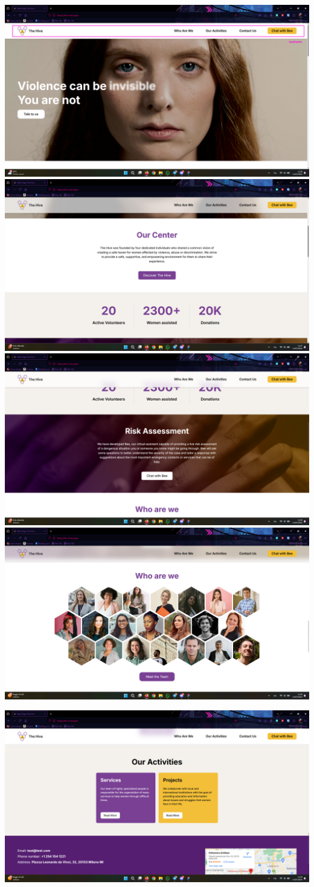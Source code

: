 \includegraphics[width=0.5\linewidth]{img/design-document/website-screenshots/homepage-1.png}
\includegraphics[width=0.5\linewidth]{img/design-document/website-screenshots/homepage-2.png}
\includegraphics[width=0.5\linewidth]{img/design-document/website-screenshots/homepage-3.png}
\includegraphics[width=0.5\linewidth]{img/design-document/website-screenshots/homepage-4.png}
\begin{center}
    \includegraphics[width=0.5\linewidth]{img/design-document/website-screenshots/homepage-5.png}
\end{center}

